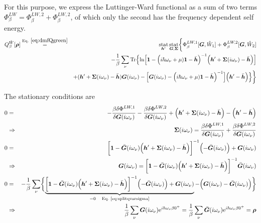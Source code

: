 \documentclass[11pt,a4paper]{report}
\begin{document}
For this purpose, we express the Luttinger-Ward functional as a sum
of two terms $\Phi^{LW}_\beta=\Phi^{LW,2}_\beta+\Phi^{LW,2}_\beta$, of
which only the second has the frequency dependent self energy.
\begin{eqnarray}
Q^{\hat{W}}_\beta[\mat{\rho}]
&\eqrel{eq:dmfQgreen}{=}&
\stat_{\mat{h}'}\stat_{\mat{G},\mat{\Sigma}}
\biggl\lbrace
\Phi^{LW,1}_\beta[\mat{G},\hat{W}_1]
+\Phi^{LW,2}_\beta[\mat{G},\hat{W}_2]
\nonumber\\
&&-\frac{1}{\beta}\sum_\nu\Tr\Bigl\lbrace
\ln\Bigl[
\mat{1}-
\Bigl(i\hbar\omega_\nu+\mu)\mat{1}-\bar{\mat{h}}\Bigr)^{-1}
\Bigl(\mat{h}'+\mat{\Sigma}(i\omega_\nu)-\bar{\mat{h}}\Bigr)
\Bigr]
\nonumber\\&&
+(\mat{h}'+\mat{\Sigma}(i\omega_\nu)-\bar{\mat{h}})\mat{G}(i\omega_\nu)
-
\Bigl[
\mat{G}(i\omega_\nu)
-\Bigl(i\hbar\omega_\nu+\mu)\mat{1}-\bar{\mat{h}}\Bigr)^{-1}
\Bigr]
\Bigl(\mat{h}'-\bar{\mat{h}}\Bigr)\Bigr\rbrace
\biggr\rbrace
\nonumber\\
\label{eq:dmfQgreenbeforedivision}
\end{eqnarray}

The stationary conditions are
\begin{eqnarray}
0&=&-\frac{\beta\delta\Phi^{LW,1}}{\delta\mat{G}(i\omega_\nu)}
-\frac{\beta\delta\Phi^{LW,2}}{\delta\mat{G}(i\omega_\nu)}
+\Bigl(\mat{h}'+\mat{\Sigma}(i\omega_\nu)-\bar{\mat{h}}\Bigr)
-\Bigl(\mat{h}'-\bar{\mat{h}}\Bigr)
\nonumber\\
&\Rightarrow&\qquad
\mat{\Sigma}(i\omega_\nu)
=\frac{\beta\delta\Phi^{LW,1}}{\delta\mat{G}(i\omega_\nu)}
+\frac{\beta\delta\Phi^{LW,2}}{\delta\mat{G}(i\omega_\nu)}
\nonumber\\
0&=&\biggl[\mat{1}-\bar{\mat{G}}(i\omega_\nu)
\Bigl(\mat{h}'+\mat{\Sigma}(i\omega_\nu)-\bar{\mat{h}}\Bigr)\biggr]^{-1}
\Bigl(-\bar{\mat{G}}(i\omega_\nu)\Bigr)+\mat{G}(i\omega_\nu)
\label{eq:splitqvarsigma}
\\
&\Rightarrow&\qquad
\mat{G}(i\omega_\nu)=\biggl[\mat{1}-\bar{\mat{G}}(i\omega_\nu)
\Bigl(\mat{h}'
+\mat{\Sigma}(i\omega_\nu)-\bar{\mat{h}}\Bigr)\biggr]^{-1}
\bar{\mat{G}}(i\omega_\nu)
\nonumber\\
0&=&
-\frac{1}{\beta}\sum_\nu\biggl\lbrace
\underbrace{\biggl[\mat{1}-\bar{\mat{G}}(i\omega_\nu)
\Bigl(\mat{h}'+\mat{\Sigma}(i\omega_\nu)-\bar{\mat{h}}\Bigr)\biggr]^{-1}
\Bigl(-\bar{\mat{G}}(i\omega_\nu)\Bigr)+\mat{G}(i\omega_\nu)}
_{=0\quad\text{\eq{eq:splitqvarsigma}}}
-\Bigl(\mat{G}(i\omega_\nu)
-\bar{\mat{G}}(i\omega_\nu)\Bigr)\biggr\rbrace
\nonumber\\
&\Rightarrow&\qquad
\frac{1}{\beta}\sum_\nu
\mat{G}(i\omega_\nu)\e{i\hbar\omega_\nu\beta0^+}
=\frac{1}{\beta}\sum_\nu
\bar{\mat{G}}(i\omega_\nu)\e{i\hbar\omega_\nu\beta0^+}
=\mat{\rho}
\end{eqnarray}
\end{document}
